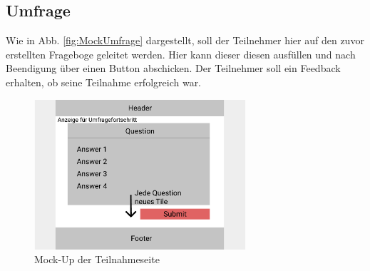 \subsection{Umfrage}
\label{ssec:konzept:client:umfrage}
Wie in Abb. \vref{fig:MockUmfrage} dargestellt, soll der Teilnehmer hier auf den zuvor erstellten Frageboge geleitet werden. 
Hier kann dieser diesen ausfüllen und nach Beendigung über einen Button abschicken. 
Der Teilnehmer soll ein Feedback erhalten, ob seine Teilnahme erfolgreich war. 

\begin{figure}[h]
	\centering
	\includegraphics[width=0.7\textwidth]{img/konzeption/client/umfrage_teilnehmer}
	\captionsetup{justification=centering, format=plain}
	\caption[Mock-Up der Teilnahmeseite]{Mock-Up der Teilnahmeseite \\\figma}
	\label{fig:MockUmfrageTeilnehmer}
\end{figure}